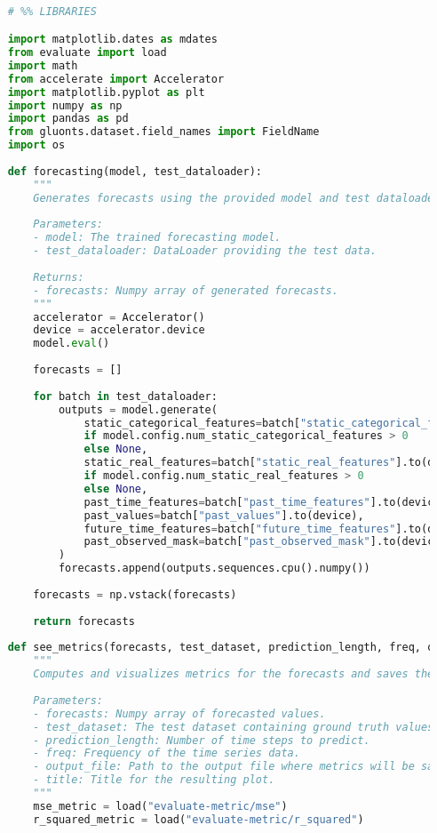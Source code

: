 \begin{lstlisting}[language=Python, caption={Code for evaluating the model’s performance}, breaklines=true, label=code6]

    # %% LIBRARIES

    import matplotlib.dates as mdates
    from evaluate import load
    import math
    from accelerate import Accelerator
    import matplotlib.pyplot as plt
    import numpy as np
    import pandas as pd
    from gluonts.dataset.field_names import FieldName
    import os
    
    def forecasting(model, test_dataloader):
        """
        Generates forecasts using the provided model and test dataloader.
    
        Parameters:
        - model: The trained forecasting model.
        - test_dataloader: DataLoader providing the test data.
    
        Returns:
        - forecasts: Numpy array of generated forecasts.
        """
        accelerator = Accelerator()
        device = accelerator.device
        model.eval()
    
        forecasts = []
    
        for batch in test_dataloader:
            outputs = model.generate(
                static_categorical_features=batch["static_categorical_features"].to(device)
                if model.config.num_static_categorical_features > 0
                else None,
                static_real_features=batch["static_real_features"].to(device)
                if model.config.num_static_real_features > 0
                else None,
                past_time_features=batch["past_time_features"].to(device),
                past_values=batch["past_values"].to(device),
                future_time_features=batch["future_time_features"].to(device),
                past_observed_mask=batch["past_observed_mask"].to(device),
            )
            forecasts.append(outputs.sequences.cpu().numpy())
    
        forecasts = np.vstack(forecasts)
    
        return forecasts
    
    def see_metrics(forecasts, test_dataset, prediction_length, freq, output_file, title):
        """
        Computes and visualizes metrics for the forecasts and saves the results to a file.
    
        Parameters:
        - forecasts: Numpy array of forecasted values.
        - test_dataset: The test dataset containing ground truth values.
        - prediction_length: Number of time steps to predict.
        - freq: Frequency of the time series data.
        - output_file: Path to the output file where metrics will be saved.
        - title: Title for the resulting plot.
        """
        mse_metric = load("evaluate-metric/mse")
        r_squared_metric = load("evaluate-metric/r_squared")
    

\end{lstlisting}
